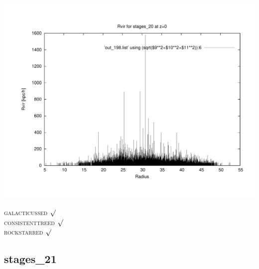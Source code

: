 \includegraphics[scale=0.3]{stages_20/plot_rvir_z0.pdf}

\textsc{galacticussed} $\surd$ \\
\textsc{consistenttreed} $\surd$ \\ 
\textsc{rockstarred} $\surd$

% 
%
%
%
%
%
%
%


\newpage
\subsection{stages\_21}


